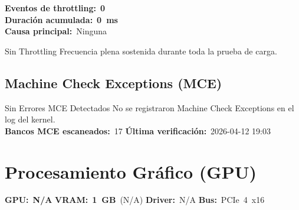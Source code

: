 \documentclass[11pt, a4paper, final]{article}
\newcommand{\mv}[1]{\textcolor{AMPrimary}{\textbf{#1}}}
\begin{document}
\vspace{0.3cm}

\begin{minipage}[t]{0.48\linewidth}
  \vspace{0pt} %
  \small
  \textbf{Eventos de throttling:}\ \mv{0}\\
  \textbf{Duración acumulada:}\ \mv{0\ ms}\\
  \textbf{Causa principal:}\ Ninguna
\end{minipage}
\hfill
\begin{minipage}[t]{0.48\linewidth}
  \vspace{0pt} %
    \begin{amboxok}{Sin Throttling}
    \scriptsize Frecuencia plena sostenida durante toda la prueba de carga.
  \end{amboxok}
  \end{minipage}

\vspace{0.6cm}


\subsection{Machine Check Exceptions (MCE)}

\begin{amboxok}{Sin Errores MCE Detectados}
  \small
  No se registraron Machine Check Exceptions en el log del kernel.\\[3pt]
  \textbf{Bancos MCE escaneados:}\ 17\quad
  \textbf{Última verificación:}\ 2026-04-12 19:03
\end{amboxok}

\newpage


\section{Procesamiento Gráfico (GPU)}

\begin{componentinfo}
  \small
  \textbf{GPU:}\ \mv{N/A}\hfill
  \textbf{VRAM:}\ \mv{1\ GB}\ (N/A)\hfill
  \textbf{Driver:}\ N/A\hfill
  \textbf{Bus:}\ PCIe\ 4\ x16
\end{componentinfo}
\end{document}
